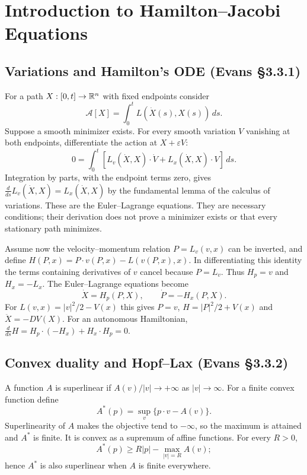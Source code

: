 \Needspace{65mm}
\section{Introduction to Hamilton--Jacobi Equations}
\label{sec:3-3}

\subsection{Variations and Hamilton's ODE (Evans \S3.3.1)}
For a path $X:[0,t]\to\mathbb{R}^n$ with fixed endpoints consider
\[
 \mathcal A[X]=\int_0^t L(\dot X(s),X(s))\,ds.
\]
Suppose a smooth minimizer exists. For every smooth variation $V$
vanishing at both endpoints, differentiate the action at $X+\varepsilon V$:
\[
 0=\int_0^t[L_v(\dot X,X)\cdot\dot V+L_x(\dot X,X)\cdot V]\,ds.
\]
Integration by parts, with the endpoint terms zero, gives
$\frac d{ds}L_v(\dot X,X)=L_x(\dot X,X)$ by the fundamental lemma
of the calculus of variations. These are the Euler--Lagrange equations.
They are necessary conditions; their derivation does not prove a
minimizer exists or that every stationary path minimizes.

Assume now the velocity--momentum relation $P=L_v(v,x)$ can be inverted,
and define
$H(P,x)=P\cdot v(P,x)-L(v(P,x),x)$.
In differentiating this identity the terms containing derivatives of
$v$ cancel because $P=L_v$. Thus $H_p=v$ and $H_x=-L_x$.
The Euler--Lagrange equations become
\[
 \dot X=H_p(P,X),\qquad \dot P=-H_x(P,X).
\]
For $L(v,x)=|v|^2/2-V(x)$ this gives $P=v$,
$H=|P|^2/2+V(x)$ and $\ddot X=-DV(X)$.
For an autonomous Hamiltonian,
$\frac d{ds}H=H_p\cdot(-H_x)+H_x\cdot H_p=0$.
\Needspace{45mm}

\subsection{Convex duality and Hopf--Lax (Evans \S3.3.2)}
\label{sec:3-hopflax}
A function $A$ is superlinear if $A(v)/|v|\to+\infty$ as $|v|\to\infty$.
For a finite convex function define
\[
 A^*(p)=\sup_v\{p\cdot v-A(v)\}.
\]
Superlinearity of $A$ makes the objective tend to $-\infty$,
so the maximum is attained and $A^*$ is finite.
It is convex as a supremum of affine functions.
For every $R>0$,
\[
 A^*(p)\geq R|p|-\max_{|v|=R}A(v);
\]
hence $A^*$ is also superlinear when $A$ is finite everywhere.

